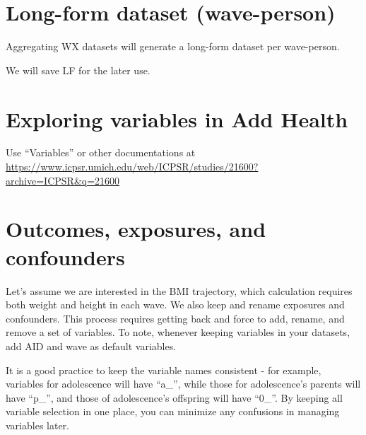 \documentclass[
]{book}
\newenvironment{Shaded}{\begin{snugshade}}{\end{snugshade}}
\newcommand{\CommentTok}[1]{\textcolor[rgb]{0.56,0.35,0.01}{\textit{#1}}}
\newcommand{\FunctionTok}[1]{\textcolor[rgb]{0.00,0.00,0.00}{#1}}
\newcommand{\NormalTok}[1]{#1}
\newcommand{\OtherTok}[1]{\textcolor[rgb]{0.56,0.35,0.01}{#1}}
\newcommand{\SpecialCharTok}[1]{\textcolor[rgb]{0.00,0.00,0.00}{#1}}
\begin{document}
\hypertarget{long-form-dataset-wave-person}{%
\section{Long-form dataset (wave-person)}\label{long-form-dataset-wave-person}}

Aggregating WX datasets will generate a long-form dataset per wave-person.

\begin{Shaded}
\end{Shaded}

We will save LF for the later use.

\hypertarget{exploring-variables-in-add-health}{%
\section{Exploring variables in Add Health}\label{exploring-variables-in-add-health}}

Use ``Variables'' or other documentations at \url{https://www.icpsr.umich.edu/web/ICPSR/studies/21600?archive=ICPSR\&q=21600}

\hypertarget{outcomes-exposures-and-confounders}{%
\section{Outcomes, exposures, and confounders}\label{outcomes-exposures-and-confounders}}

Let's assume we are interested in the BMI trajectory, which calculation requires both weight and height in each wave. We also keep and rename exposures and confounders. This process requires getting back and force to add, rename, and remove a set of variables. To note, whenever keeping variables in your datasets, add AID and wave as default variables.

It is a good practice to keep the variable names consistent - for example, variables for adolescence will have ``a\_'', while those for adolescence's parents will have ``p\_'', and those of adolescence's offspring will have ``0\_''. By keeping all variable selection in one place, you can minimize any confusions in managing variables later.
\end{document}
